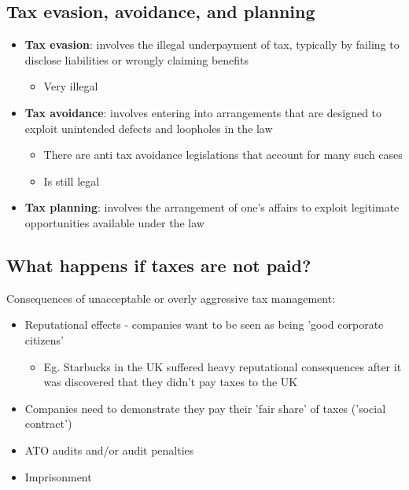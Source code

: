 \documentclass{article}
\begin{document}
	\subsection{Tax evasion, avoidance, and planning}

		\begin{itemize}
			\item \textbf{Tax evasion}: involves the illegal underpayment of tax, typically by failing to disclose liabilities or wrongly claiming benefits
				\begin{itemize}
					\item Very illegal
				\end{itemize}
			\item \textbf{Tax avoidance}: involves entering into arrangements that are designed to exploit unintended defects and loopholes in the law
				\begin{itemize}
					\item There are anti tax avoidance legislations that account for many such cases
					\item Is still legal
				\end{itemize}
			\item \textbf{Tax planning}: involves the arrangement of one's affairs to exploit legitimate opportunities available under the law
		\end{itemize}

	\subsection{What happens if taxes are not paid?}

		Consequences of unacceptable or overly aggressive tax management:
			
			\begin{itemize}
				\item Reputational effects - companies want to be seen as being 'good corporate citizens'
					\begin{itemize}
						\item Eg. Starbucks in the UK suffered heavy reputational consequences after it was discovered that they didn't pay taxes to the UK
					\end{itemize}
				\item Companies need to demonstrate they pay their 'fair share' of taxes ('social contract')
				\item ATO audits and/or audit penalties
				\item Imprisonment
			\end{itemize}
\end{document}

